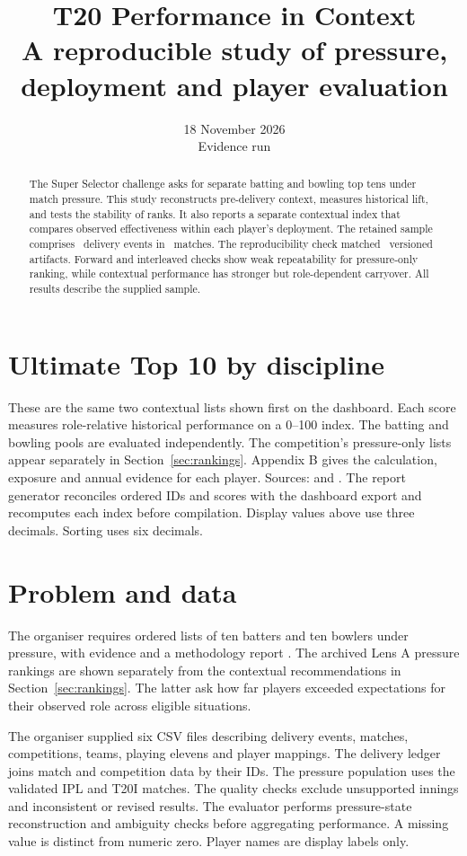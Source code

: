 \documentclass[12pt,a4paper]{article}
\title{\textcolor{ResearchRose}{T20 Performance in Context}\\[0.4em]
\large A reproducible study of pressure, deployment and player evaluation}
\author{\ResearchAuthor}
\date{18 November 2026\\ \small Evidence run \texttt{\RunID}}
\begin{document}
\maketitle
\begin{abstract}
The Super Selector challenge asks for separate batting and bowling top tens under match pressure. This study reconstructs pre-delivery context, measures historical lift, and tests the stability of ranks. It also reports a separate contextual index that compares observed effectiveness within each player's deployment. The retained sample comprises \DeliveryCount\ delivery events in \MatchCount\ matches. The reproducibility check matched \ReplayCount\ versioned artifacts. Forward and interleaved checks show weak repeatability for pressure-only ranking, while contextual performance has stronger but role-dependent carryover. All results describe the supplied sample.
\end{abstract}
\clearpage
\section{Ultimate Top 10 by discipline}\label{sec:ultimate}
These are the same two contextual lists shown first on the dashboard. Each score measures role-relative historical performance on a 0--100 index. The batting and bowling pools are evaluated independently. The competition's pressure-only lists appear separately in Section~\ref{sec:rankings}. Appendix B gives the calculation, exposure and annual evidence for each player.
\ContextTable
Sources:  and . The report generator reconciles ordered IDs and scores with the dashboard export and recomputes each index before compilation. Display values above use three decimals. Sorting uses six decimals.
\clearpage
\tableofcontents
\clearpage

\section{Problem and data}
The organiser requires ordered lists of ten batters and ten bowlers under pressure, with evidence and a methodology report \cite{organiser}. The archived Lens A pressure rankings are shown separately from the contextual recommendations in Section~\ref{sec:rankings}. The latter ask how far players exceeded expectations for their observed role across eligible situations.

The organiser supplied six CSV files describing delivery events, matches, competitions, teams, playing elevens and player mappings. The delivery ledger joins match and competition data by their IDs. The pressure population uses the validated IPL and T20I matches. The quality checks exclude unsupported innings and inconsistent or revised results. The evaluator performs pressure-state reconstruction and ambiguity checks before aggregating performance. A missing value is distinct from numeric zero. Player names are display labels only.
\end{document}
